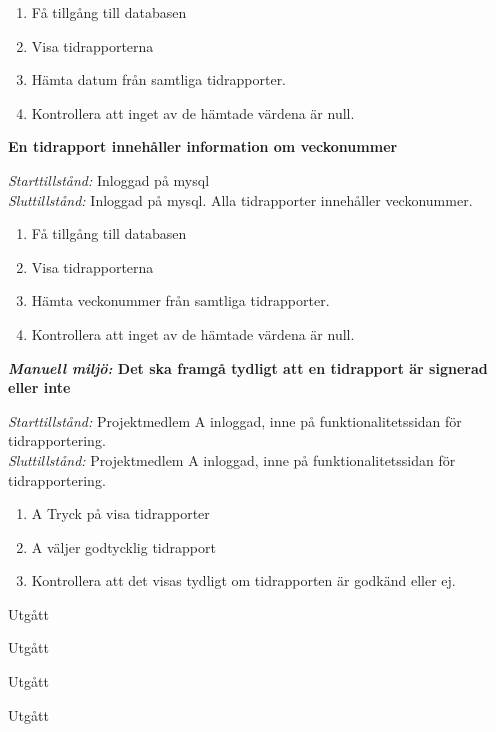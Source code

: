 \documentclass[a4paper]{article}
\begin{document}
\begin{FT}
\begin{enumerate}
\item Få tillgång till databasen
\item Visa tidrapporterna
\item Hämta datum från samtliga tidrapporter.
\item Kontrollera att inget av de hämtade värdena är null.
\end{enumerate}


\item
\textbf{En tidrapport innehåller information om veckonummer}

\emph{Starttillstånd:} Inloggad på mysql\\
\emph{Sluttillstånd:} Inloggad på mysql. Alla tidrapporter innehåller veckonummer.\\

\begin{enumerate}
\item Få tillgång till databasen
\item Visa tidrapporterna
\item Hämta veckonummer från samtliga tidrapporter.
\item Kontrollera att inget av de hämtade värdena är null.
\end{enumerate}


\item
\textbf{\emph{Manuell miljö:} Det ska framgå tydligt att en tidrapport är signerad eller inte}

\emph{Starttillstånd:} Projektmedlem A inloggad, inne på funktionalitetssidan för tidrapportering.\\
\emph{Sluttillstånd:} Projektmedlem A inloggad, inne på funktionalitetssidan för tidrapportering.

\begin{enumerate}
\item A Tryck på visa tidrapporter
\item A väljer godtycklig tidrapport
\item Kontrollera att det visas tydligt om tidrapporten är godkänd eller ej.
\end{enumerate}


\item Utgått
\item Utgått
\item Utgått
\item Utgått

\end{FT}
\end{document}
